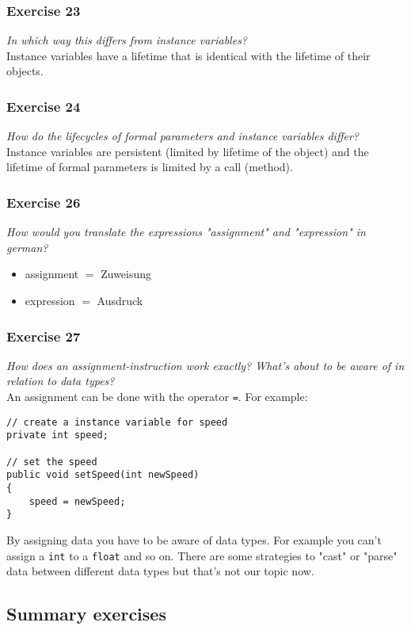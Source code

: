 \subsubsection*{Exercise 23}
\textit{In which way this differs from instance variables?}\\

Instance variables have a lifetime that is identical with the lifetime of
their objects.

\subsubsection*{Exercise 24}
\textit{How do the lifecycles of formal parameters and instance variables 
	differ?}\\

Instance variables are persistent (limited by lifetime of the object) and
the lifetime of formal parameters is limited by a call (method).

\subsubsection*{Exercise 26}
\textit{How would you translate the expressions "assignment" and 
	"expression" in german?}\\

\begin{itemize}
	\item assignment $=$ Zuweisung
	\item expression $=$ Ausdruck
\end{itemize}

\subsubsection*{Exercise 27}
\textit{How does an assignment-instruction work exactly? What's about to 
	be aware of in relation to data types?}\\

An assignment can be done with the operator \lstinline{=}. For example:
\begin{lstlisting}
// create a instance variable for speed
private int speed;

// set the speed
public void setSpeed(int newSpeed)
{
	speed = newSpeed;
}
\end{lstlisting}
By assigning data
you have to be aware of data types. For example you can't assign a 
\lstinline{int} to a \lstinline{float} and so on. There are some strategies
to "cast" or "parse" data between different data types but that's not our 
topic now.

\subsection{Summary exercises}

